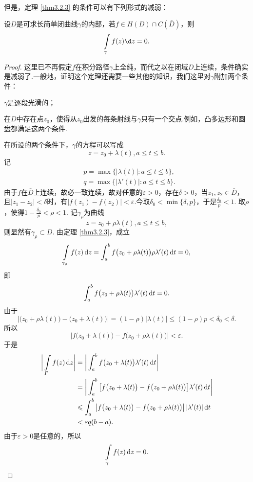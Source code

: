 但是，定理 \ref{thm3.2.3} 的条件可以有下列形式的减弱：
\begin{theorem}\label{thm3.2.4}
  设$D$是可求长简单闭曲线$\gamma$的内部，若$f\in H(D)\cap C(\bar D)$，则
  \[
    \int\limits_\gamma f(z)\d z= 0.
  \]
\end{theorem}
\begin{proof}
  这里已不再假定$f$在积分路径$\gamma$上全纯，而代之以在闭域$D$上连续，条件确实是减弱了.一般地，证明这个定理还需要一些其他的知识，我们这里对$\gamma$附加两个条件：
\begin{eenum}
  \item $\gamma$是逐段光滑的；
  \item 在$D$中存在点$z_0$，使得从$z_0$出发的每条射线与$\gamma$只有一个交点.例如，凸多边形和圆盘都满足这两个条件.
\end{eenum}

在所设的两个条件下，$\gamma$的方程可以写成
\[
  z = z_0 + \lambda(t), a\le t\le b.
\]
记
\begin{align*}
  & p = \max\{|\lambda(t)|:a\le t\le b\},\\
  & q = \max\{|\lambda'(t)|:a\le t\le b\}.
\end{align*}
由于$f$在$\bar D$上连续，故必一致连续，故对任意的$\varepsilon>0$，存在$\delta>0$，当$z_1,z_2\in\bar D$，且$|z_1-z_2|<\delta$时，有$|f(z_1)-f(z_2)|<\varepsilon$.今取$\delta_0<\min\{\delta,p\}$，于是$\frac{\delta_0}p<1$. 取$\rho$，使得$1-\frac{\delta_0}p<\rho<1$. 记$\gamma_\rho$为曲线
\[
  z = z_0 + \rho\lambda(t), a\le t\le b,
\]
则显然有$\gamma_\rho\subset D$. 由定理 \ref{thm3.2.3}，成立
\[
  \int\limits_{\gamma_\rho}f(z)\mathop{}\!\mathrm dz = \int_a^bf\big(z_0+\rho\lambda(t)\big)
  \rho\lambda'(t)\mathop{}\!\mathrm{d} t = 0,
\]
即
\[
  \int_a^bf\big(z_0 + \rho\lambda(t)\big)\lambda'(t) \mathop{}\!\mathrm{d} t = 0.
\]
由于
\[
  \big|\big(z_0+\rho\lambda(t)\big)-\big(z_0+\lambda(t)\big)\big|
  = (1-\rho)|\lambda(t)|\le(1-\rho)p<\delta_0<\delta.
\]
所以
\[
  \big|f\big(z_0+\lambda(t)\big)-f\big(z_0 + \rho\lambda(t)\big)\big| < \varepsilon.
\]
于是
\begin{align*}
  \bigg|\int\limits_\varGamma f(z)\mathop{}\!\mathrm dz\bigg|
  & = \bigg|\int_a^bf\big(z_0+\lambda(t)\big)\lambda'(t)\mathop{}\!\mathrm{d} t\bigg| \\
  & = \bigg|\int_a^b\big[f\big(z_0+\lambda(t)\big)-f\big(z_0+\rho\lambda(t)\big)\big]
    \lambda'(t)\mathop{}\!\mathrm{d} t\bigg| \\
  & \leqslant \int_a^b\big|f\big(z_0+\lambda(t)\big)-f\big(z_0+
  \rho\lambda(t)\big)\big|\,|\lambda'(t)|\mathop{}\!\mathrm{d} t \\
  & < \varepsilon q(b-a).
\end{align*}
由于$\varepsilon>0$是任意的，所以
\begin{equation*}
  \int\limits_\gamma f(z)\mathop{}\!\mathrm dz = 0. \qedhere
\end{equation*}
\end{proof}

